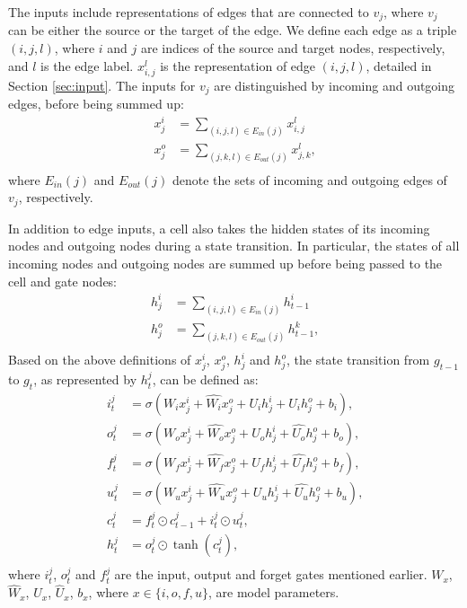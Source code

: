 \documentclass[11pt,a4paper]{article}
\begin{document}
The inputs include representations of edges that are connected to $v_j$, where $v_j$ can be either the source or the target of the edge.
We define each edge as a triple $(i,j,l)$, where $i$ and $j$ are indices of the source and target nodes, respectively, and $l$ is the edge label.
$x_{i,j}^l$ is the representation of edge $(i,j,l)$, detailed in Section \ref{sec:input}.
The inputs for $v_j$ are distinguished by incoming and outgoing edges, before being summed up:
\begin{equation*}
\begin{split}
x_j^{i} &= \sum_{(i,j,l)\in E_{in}(j)} x_{i,j}^l \\
x_j^{o} &= \sum_{(j,k,l)\in E_{out}(j)} x_{j,k}^l \textrm{,} \\
\end{split}
\end{equation*}
where $E_{in}(j)$ and $E_{out}(j)$ denote the sets of incoming and outgoing edges of $v_j$, respectively.

In addition to edge inputs, a cell also takes the hidden states of its incoming nodes and outgoing nodes during a state transition. 
In particular, the states of all incoming nodes and outgoing nodes are summed up before being passed to the cell and gate nodes:
\begin{equation*}
\begin{split}
h_j^{i} &= \sum_{(i,j,l)\in E_{in}(j)} h_{t-1}^{i} \\
h_j^{o} &= \sum_{(j,k,l)\in E_{out}(j)} h_{t-1}^{k} \textrm{,} \\
\end{split}
\end{equation*} 
Based on the above definitions of $x_j^{i}$, $x_j^{o}$, $h_j^{i}$ and $h_j^{o}$, the state transition from $g_{t-1}$ to $g_t$, as represented by $h_t^j$, can be defined as:
\begin{equation*}
\begin{split}
i_t^j &= \sigma(W_i x_j^{i} + \hat{W_i} x_j^{o} + U_i h_j^{i} + \hat{U_i} h_j^{o} + b_i) \textrm{,} \\
o_t^j &= \sigma(W_o x_j^{i} + \hat{W_o} x_j^{o} + U_o h_j^{i} + \hat{U_o} h_j^{o} + b_o) \textrm{,} \\
f_t^j &= \sigma(W_f x_j^{i} + \hat{W_f} x_j^{o} + U_f h_j^{i} + \hat{U_f} h_j^{o} + b_f) \textrm{,} \\
u_t^j &= \sigma(W_u x_j^{i} + \hat{W_u} x_j^{o} + U_u h_j^{i} + \hat{U_u} h_j^{o} + b_u) \textrm{,} \\
c_t^j &= f_t^j \odot c_{t-1}^j + i_t^j \odot u_t^j \textrm{,} \\
h_t^j &= o_t^j \odot \tanh (c_t^j) \textrm{,} \\
\end{split}
\end{equation*}
where $i_t^j$, $o_t^j$ and $f_t^j$ are the input, output and forget gates mentioned earlier. $W_x$, $\hat{W}_x$, $U_x$, $\hat{U}_x$, $b_x$, where $x \in \{i, o, f, u\}$, are model parameters. 
\end{document}
